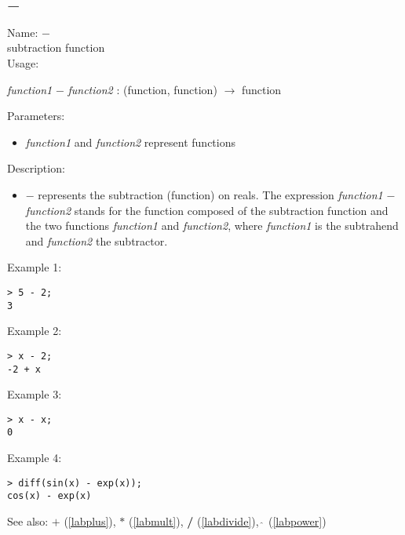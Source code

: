 \subsection{$-$}
\label{labminus}
\noindent Name: \textbf{$-$}\\
subtraction function\\
\noindent Usage: 
\begin{center}
\emph{function1} \textbf{$-$} \emph{function2} : (\textsf{function}, \textsf{function}) $\rightarrow$ \textsf{function}\\
\end{center}
Parameters: 
\begin{itemize}
\item \emph{function1} and \emph{function2} represent functions
\end{itemize}
\noindent Description: \begin{itemize}

\item \textbf{$-$} represents the subtraction (function) on reals. 
   The expression \emph{function1} \textbf{$-$} \emph{function2} stands for
   the function composed of the subtraction function and the two
   functions \emph{function1} and \emph{function2}, where \emph{function1} is 
   the subtrahend and \emph{function2} the subtractor.
\end{itemize}
\noindent Example 1: 
\begin{center}\begin{minipage}{15cm}\begin{Verbatim}[frame=single]
> 5 - 2;
3
\end{Verbatim}
\end{minipage}\end{center}
\noindent Example 2: 
\begin{center}\begin{minipage}{15cm}\begin{Verbatim}[frame=single]
> x - 2;
-2 + x
\end{Verbatim}
\end{minipage}\end{center}
\noindent Example 3: 
\begin{center}\begin{minipage}{15cm}\begin{Verbatim}[frame=single]
> x - x;
0
\end{Verbatim}
\end{minipage}\end{center}
\noindent Example 4: 
\begin{center}\begin{minipage}{15cm}\begin{Verbatim}[frame=single]
> diff(sin(x) - exp(x));
cos(x) - exp(x)
\end{Verbatim}
\end{minipage}\end{center}
See also: \textbf{$+$} (\ref{labplus}), \textbf{$*$} (\ref{labmult}), \textbf{/} (\ref{labdivide}), \textbf{$\mathbf{\hat{~}}$} (\ref{labpower})
